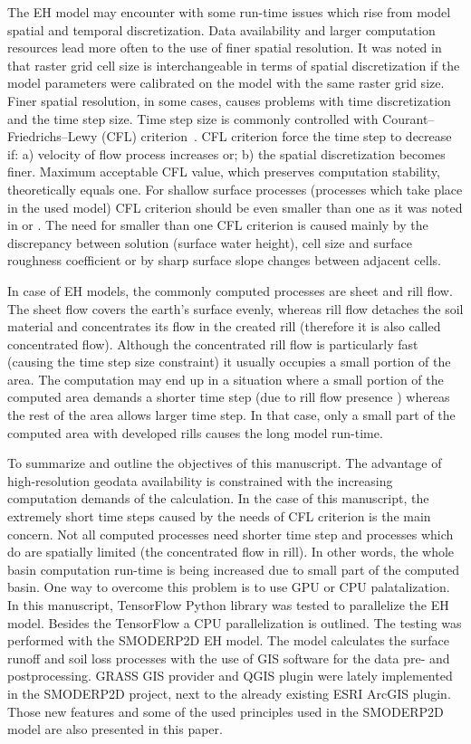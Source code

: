 The EH model may encounter with some run-time issues which 
rise from model spatial and temporal discretization. 
Data availability and larger computation resources lead more often 
to the use of finer spatial resolution. 
It was noted in \cite{molnar2000} that raster grid cell size is interchangeable 
in terms of spatial discretization if the model parameters 
were calibrated on the model with the same raster grid size. 
Finer spatial resolution, in some 
cases, causes problems with time discretization and the time step size. 
Time step size is commonly 
controlled with Courant–Friedrichs–Lewy (CFL) criterion~\cite{courant1928}. 
CFL criterion force the time step to decrease if: a) velocity of flow 
process increases or; b) the spatial discretization becomes finer. 
Maximum acceptable CFL value, which preserves computation stability, theoretically equals one. 
For shallow surface processes (processes which take place in the used model)
CFL criterion should 
be even smaller than one as it was noted in \cite{zhang1989}
or \cite{esteves2000}. The need for smaller than one CFL criterion 
is caused mainly by the discrepancy between solution (surface water height), 
cell size and surface roughness coefficient 
or by sharp surface slope changes between adjacent cells. 

In case of EH models, the commonly computed processes are sheet 
and 
rill flow. 
The sheet flow covers the earth's surface evenly, whereas rill flow detaches 
the soil material and concentrates its flow in the created rill 
(therefore it is also called concentrated flow).
Although the concentrated rill flow is particularly fast (causing  
the time step size constraint) it usually occupies a small portion of the area. 
The computation may end up in a situation where a 
small portion of the computed area demands a shorter time step 
(due to rill flow presence ) whereas the rest of the area allows larger time step. 
In that case, only a small part of the computed area with developed rills causes the long model run-time. 

To summarize and outline the objectives of this manuscript. The advantage of high-resolution
geodata availability is constrained with the increasing computation demands
of the calculation. In the case of this manuscript, the extremely 
short time steps caused by the needs of CFL criterion is the main concern. 
Not all computed processes need shorter time step and processes which do are spatially limited (the concentrated flow in rill). 
In other words, 
the whole basin computation run-time is being increased due to small part
of the computed basin. One way to overcome this problem is to use 
GPU or CPU palatalization. In this manuscript, TensorFlow Python library 
\cite{tensorflow2015-whitepaper} was tested to parallelize the EH model. 
Besides the TensorFlow a CPU parallelization is outlined. 
The testing was performed with the SMODERP2D EH model. The model calculates the surface runoff
and soil loss processes with the use of GIS software for the data pre- and postprocessing. 
GRASS GIS provider and QGIS plugin were lately implemented in the SMODERP2D project, next to the already existing ESRI ArcGIS plugin. 
Those new features and some of the used principles used in the SMODERP2D model are also presented in this paper. 

